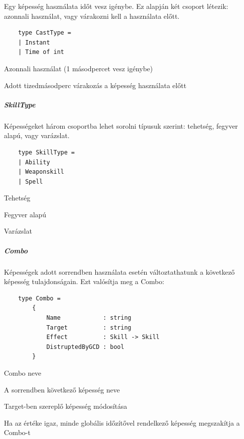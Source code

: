 \documentclass[12pt]{article}
\begin{document}
	Egy képesség használata időt vesz igénybe. Ez alapján két csoport létezik: azonnali használat, vagy várakozni kell a használata előtt.
	
	\begin{lstlisting}
	type CastType =
	| Instant
	| Time of int
	\end{lstlisting}
	
	\begin{description}[align=left,labelwidth=2.5cm]
		\item [Instant] Azonnali használat (1 másodpercet vesz igénybe)
		\item [Time] Adott tizedmásodperc várakozás a képesség használata előtt
	\end{description}
	
	\subparagraph{SkillType}
	
	Képességeket három csoportba lehet sorolni típusuk szerint: tehetség, fegyver alapú, vagy varázslat.
	
	\begin{lstlisting}
	type SkillType =
	| Ability
	| Weaponskill
	| Spell
	\end{lstlisting}
	
	\begin{description}[align=left,labelwidth=2.5cm]
		\item [Ability] Tehetség
		\item [Weaponskill] Fegyver alapú
		\item [Spell] Varázslat
	\end{description}
	
	\subparagraph{Combo}
	
	Képességek adott sorrendben használata esetén változtathatunk a következő képesség tulajdonságain. Ezt valósítja meg a Combo:
	
	\begin{lstlisting}
	type Combo =
		{
			Name            : string
			Target          : string
			Effect          : Skill -> Skill
			DistruptedByGCD : bool
		}
	\end{lstlisting}
	
	\begin{description}[align=left,labelwidth=3cm]
		\item [Name] Combo neve
		\item [Target] A sorrendben következő képesség neve
		\item [Effect] Target-ben szereplő képesség módosítása
		\item [DistruptedByGCD] Ha az értéke igaz, minde globális időzítővel rendelkező képesség megszakítja a Combo-t
	\end{description}
	
\end{document}

